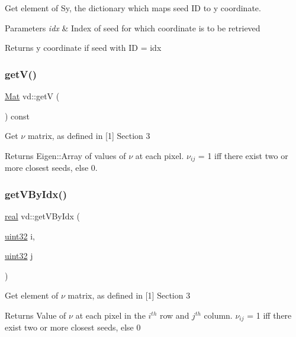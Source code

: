 Get element of Sy, the dictionary which maps seed ID to y coordinate. 
\begin{DoxyParams}{Parameters}
{\em idx} & Index of seed for which coordinate is to be retrieved \\
\hline
\end{DoxyParams}
\begin{DoxyReturn}{Returns}
y coordinate if seed with ID = idx 
\end{DoxyReturn}
\mbox{\label{classvd_aad4ea5c045b8380f83b0490af2fee0fa}} 
\subsubsection{\texorpdfstring{get\+V()}{getV()}}
{\footnotesize\ttfamily \mbox{\hyperlink{typedefs_8cpp_a9fa28c1f74e909474857584f5c7b0088}{Mat}} vd\+::getV (\begin{DoxyParamCaption}{ }\end{DoxyParamCaption}) const}

Get $\nu$ matrix, as defined in \mbox{[}1\mbox{]} Section 3 \begin{DoxyReturn}{Returns}
Eigen\+::\+Array of values of $\nu$ at each pixel. $\nu_{ij}$ = 1 iff there exist two or more closest seeds, else 0. 
\end{DoxyReturn}
\mbox{\label{classvd_a27d44f2c94b55723e9982446696b5cee}} 
\subsubsection{\texorpdfstring{get\+V\+By\+Idx()}{getVByIdx()}}
{\footnotesize\ttfamily \mbox{\hyperlink{typedefs_8cpp_a58a0c7cf2501f4492da833421be92547}{real}} vd\+::get\+V\+By\+Idx (\begin{DoxyParamCaption}\item[{\mbox{\hyperlink{typedefs_8cpp_a8ad23e2333787a214e20a58a284a5a60}{uint32}}}]{i,  }\item[{\mbox{\hyperlink{typedefs_8cpp_a8ad23e2333787a214e20a58a284a5a60}{uint32}}}]{j }\end{DoxyParamCaption})}

Get element of $\nu$ matrix, as defined in \mbox{[}1\mbox{]} Section 3 \begin{DoxyReturn}{Returns}
Value of $\nu$ at each pixel in the $ i^{th} $ row and $ j^{th} $ column. $\nu_{ij}$ = 1 iff there exist two or more closest seeds, else 0 
\end{DoxyReturn}
\mbox{\label{classvd_a090bebdbbff36888934c870daf3dcb36}} 

